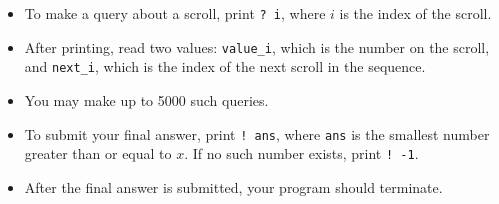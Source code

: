 \begin{itemize}
    \item To make a query about a scroll, print \texttt{? i}, where $i$ is the index of the scroll.
    \item After printing, read two values: \texttt{value\_i}, which is the number on the scroll, and \texttt{next\_i}, which is the index of the next scroll in the sequence.
    \item You may make up to 5000 such queries.
    \item To submit your final answer, print \texttt{! ans}, where \texttt{ans} is the smallest number greater than or equal to $x$. If no such number exists, print \texttt{! -1}.
    \item After the final answer is submitted, your program should terminate.
\end{itemize}
